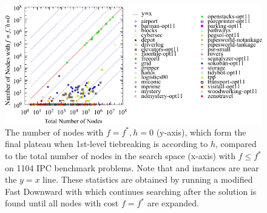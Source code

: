 \begin{figure}[htbp]
   \centering
  \includegraphics{tables/aaai16-frontier/aaai16prelim3/lmcut_frontier-front.pdf}
  \caption{
 The number of nodes with $f=f^*, h=0$ (y-axis), which form
  the final plateau when 1st-level tiebreaking is according to $h$, compared to
  the total number of nodes in the search space (x-axis) with $f\leq
  f^*$ on 1104 IPC benchmark problems.  Note that 
  and  instances are near the $y=x$ line.
  These statistics are obtained by running a modified Fast Downward with
 \lmcut which continues searching after the solution is found
 until all nodes with cost $f=f^*$ are expanded.} \label{fig:plateau}
\end{figure}

